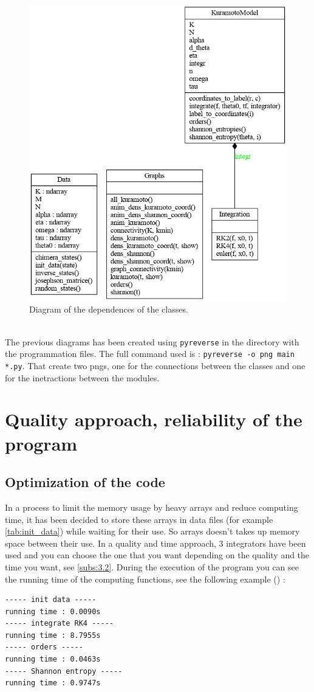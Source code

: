\documentclass[1pt, a4paper]{article}
\begin{document}
\begin{figure}[htbp]
    \centering
    \includegraphics[scale=0.4]{figures/classes_kuramotoModel.png}
    \caption{Diagram of the dependences of the classes.}
    \label{fig:diagram_classes}
\end{figure}\\
The previous diagrams has been created using \texttt{pyreverse} in the directory with the programmation files. The full command used is : \texttt{pyreverse -o png main *.py}. That create two pngs, one for the connections between the classes and one for the inetractions between the modules.
\newpage
\noindent
\section{Quality approach, reliability of the program}
\label{sec:4}
\subsection{Optimization of the code}
\label{subs:4.1}
In a process to limit the memory usage by heavy arrays and reduce computing time, it has been decided to store these arrays in data files (for example \autoref{tab:init_data}) while waiting for their use. So arrays doesn't takes up memory space between their use. In a quality and time approach, 3 integrators have been used and you can choose the one that you want depending on the quality and the time you want, see \autoref{subs:3.2}. During the execution of the program you can see the running time of the computing functions, see the following example () :
\begin{verbatim}
----- init data -----
running time : 0.0090s
----- integrate RK4 -----
running time : 8.7955s
----- orders -----
running time : 0.0463s
----- Shannon entropy -----
running time : 0.9747s
\end{verbatim}
\end{document}
